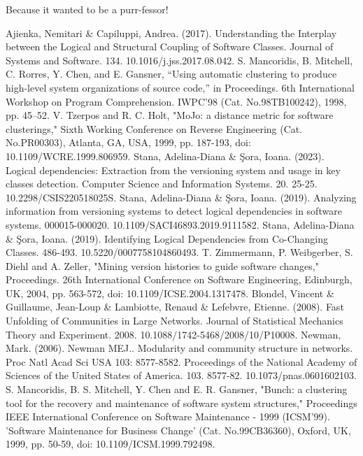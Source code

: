 \documentclass{ieeeaccess}
\begin{document}
Because it wanted to be a purr-fessor!

\begin{thebibliography}{00}

 Ajienka, Nemitari \& Capiluppi, Andrea. (2017). Understanding the Interplay between the Logical and Structural Coupling of Software Classes. Journal of Systems and Software. 134. 10.1016/j.jss.2017.08.042.
 S. Mancoridis, B. Mitchell, C. Rorres, Y. Chen, and E. Gansner, “Using automatic clustering to produce high-level system organizations of source code,” in Proceedings. 6th International Workshop on Program Comprehension. IWPC’98 (Cat. No.98TB100242), 1998, pp. 45–52.
 V. Tzerpos and R. C. Holt, "MoJo: a distance metric for software clusterings," Sixth Working Conference on Reverse Engineering (Cat. No.PR00303), Atlanta, GA, USA, 1999, pp. 187-193, doi: 10.1109/WCRE.1999.806959.
 Stana, Adelina-Diana \& Şora, Ioana. (2023). Logical dependencies: Extraction from the versioning system and usage in key classes detection. Computer Science and Information Systems. 20. 25-25. 10.2298/CSIS220518025S. 
 Stana, Adelina-Diana \& Şora, Ioana. (2019). Analyzing information from versioning systems to detect logical dependencies in software systems. 000015-000020. 10.1109/SACI46893.2019.9111582. 
 Stana, Adelina-Diana \& Şora, Ioana. (2019). Identifying Logical Dependencies from Co-Changing Classes. 486-493. 10.5220/0007758104860493. 
 T. Zimmermann, P. Weibgerber, S. Diehl and A. Zeller, "Mining version histories to guide software changes," Proceedings. 26th International Conference on Software Engineering, Edinburgh, UK, 2004, pp. 563-572, doi: 10.1109/ICSE.2004.1317478.
 Blondel, Vincent \& Guillaume, Jean-Loup \& Lambiotte, Renaud \& Lefebvre, Etienne. (2008). Fast Unfolding of Communities in Large Networks. Journal of Statistical Mechanics Theory and Experiment. 2008. 10.1088/1742-5468/2008/10/P10008. 
 Newman, Mark. (2006). Newman MEJ.. Modularity and community structure in networks. Proc Natl Acad Sci USA 103: 8577-8582. Proceedings of the National Academy of Sciences of the United States of America. 103. 8577-82. 10.1073/pnas.0601602103. 
 S. Mancoridis, B. S. Mitchell, Y. Chen and E. R. Gansner, "Bunch: a clustering tool for the recovery and maintenance of software system structures," Proceedings IEEE International Conference on Software Maintenance - 1999 (ICSM'99). 'Software Maintenance for Business Change' (Cat. No.99CB36360), Oxford, UK, 1999, pp. 50-59, doi: 10.1109/ICSM.1999.792498.

\end{thebibliography}
\end{document}
